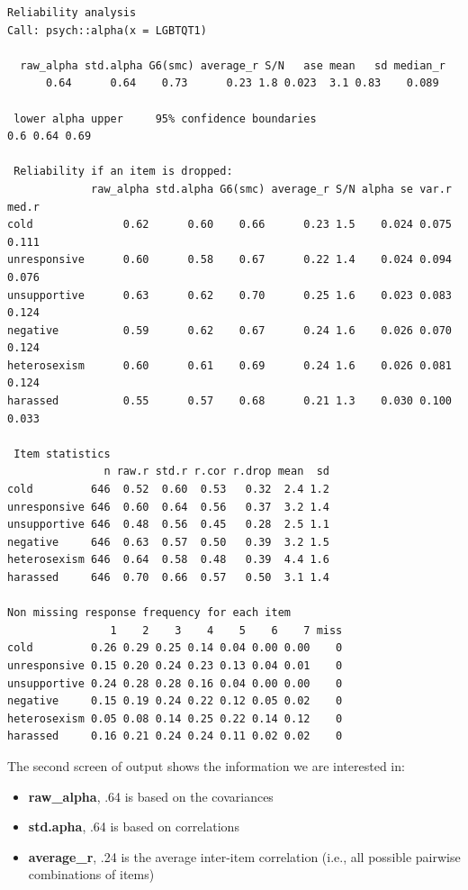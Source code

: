 \documentclass[
  english,
]{book}
\providecommand{\tightlist}{%
  \setlength{\itemsep}{0pt}\setlength{\parskip}{0pt}}
\begin{document}
\begin{verbatim}
Reliability analysis   
Call: psych::alpha(x = LGBTQT1)

  raw_alpha std.alpha G6(smc) average_r S/N   ase mean   sd median_r
      0.64      0.64    0.73      0.23 1.8 0.023  3.1 0.83    0.089

 lower alpha upper     95% confidence boundaries
0.6 0.64 0.69 

 Reliability if an item is dropped:
             raw_alpha std.alpha G6(smc) average_r S/N alpha se var.r med.r
cold              0.62      0.60    0.66      0.23 1.5    0.024 0.075 0.111
unresponsive      0.60      0.58    0.67      0.22 1.4    0.024 0.094 0.076
unsupportive      0.63      0.62    0.70      0.25 1.6    0.023 0.083 0.124
negative          0.59      0.62    0.67      0.24 1.6    0.026 0.070 0.124
heterosexism      0.60      0.61    0.69      0.24 1.6    0.026 0.081 0.124
harassed          0.55      0.57    0.68      0.21 1.3    0.030 0.100 0.033

 Item statistics 
               n raw.r std.r r.cor r.drop mean  sd
cold         646  0.52  0.60  0.53   0.32  2.4 1.2
unresponsive 646  0.60  0.64  0.56   0.37  3.2 1.4
unsupportive 646  0.48  0.56  0.45   0.28  2.5 1.1
negative     646  0.63  0.57  0.50   0.39  3.2 1.5
heterosexism 646  0.64  0.58  0.48   0.39  4.4 1.6
harassed     646  0.70  0.66  0.57   0.50  3.1 1.4

Non missing response frequency for each item
                1    2    3    4    5    6    7 miss
cold         0.26 0.29 0.25 0.14 0.04 0.00 0.00    0
unresponsive 0.15 0.20 0.24 0.23 0.13 0.04 0.01    0
unsupportive 0.24 0.28 0.28 0.16 0.04 0.00 0.00    0
negative     0.15 0.19 0.24 0.22 0.12 0.05 0.02    0
heterosexism 0.05 0.08 0.14 0.25 0.22 0.14 0.12    0
harassed     0.16 0.21 0.24 0.24 0.11 0.02 0.02    0
\end{verbatim}

The second screen of output shows the information we are interested in:

\begin{itemize}
\tightlist
\item
  \textbf{raw\_alpha}, .64 is based on the covariances
\item
  \textbf{std.apha}, .64 is based on correlations
\item
  \textbf{average\_r}, .24 is the average inter-item correlation (i.e., all possible pairwise combinations of items)
\end{itemize}
\end{document}
